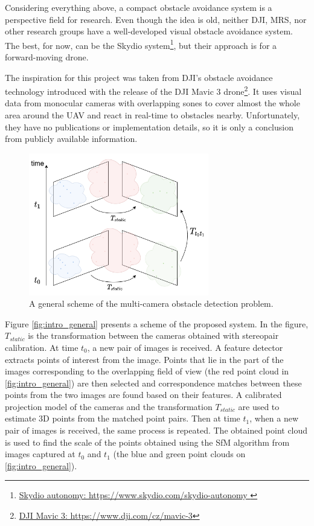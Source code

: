 Considering everything above, a compact obstacle avoidance system is a perspective field for research. 
Even though the idea is old, neither DJI, MRS, nor other research groups have a well-developed visual obstacle avoidance system. 
The best, for now, can be the Skydio system\footnote{\href{https://www.skydio.com/skydio-autonomy}{Skydio autonomy: https://www.skydio.com/skydio-autonomy }}, but their approach is for a forward-moving drone.

The inspiration for this project was taken from DJI's obstacle avoidance technology introduced with the release of the DJI Mavic 3 drone\footnote{\href{https://www.dji.com/cz/mavic-3}{DJI Mavic 3: https://www.dji.com/cz/mavic-3}}. 
It uses visual data from monocular cameras with overlapping sones to cover almost the whole area around the UAV and react in real-time to obstacles nearby. 
Unfortunately, they have no publications or implementation details, so it is only a conclusion from publicly available information.

\label{sec:problem_definition}
\begin{figure}[t]
    \centering
    \includegraphics[width=0.7\textwidth]{graphics/general_scheme.png}
    \caption{ A general scheme of the multi-camera obstacle detection problem.}
    \label{fig:intro_general}
\end{figure}

Figure \autoref{fig:intro_general} presents a scheme of the proposed system.
In the figure, $T_{static}$ is the transformation between the cameras obtained with stereopair calibration. 
At time $t_0$, a new pair of images is received.
A feature detector extracts points of interest from the image.
Points that lie in the part of the images corresponding to the overlapping field of view (the red point cloud in \autoref{fig:intro_general}) are then selected and correspondence matches between these points from the two images are found based on their features.
A calibrated projection model of the cameras and the transformation $T_{static}$ are used to estimate 3D points from the matched point pairs.
Then at time $t_1$, when a new pair of images is received, the same process is repeated. 
The obtained point cloud is used to find the scale of the points obtained using the SfM algorithm from images captured at $t_0$ and $t_1$ (the blue and green point clouds on \autoref{fig:intro_general}).

